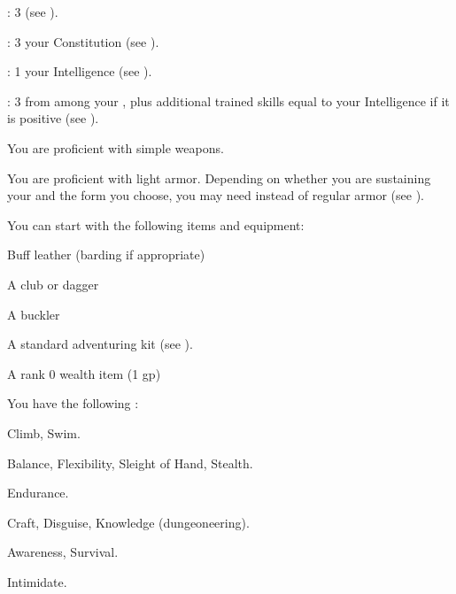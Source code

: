       \begin{raggeditemize}
          \item {}: 3 (see ).
          \item {}: 3 \add your Constitution (see ).
          \item {}: 1 \add your Intelligence (see ).
          \item {}: 3 from among your , plus additional trained skills equal to your Intelligence if it is positive (see ).
      \end{raggeditemize}

      You are proficient with simple weapons.

      You are proficient with light armor.
      Depending on whether you are sustaining your  and the form you choose, you may need  instead of regular armor (see ).

    You can start with the following items and equipment:
    \begin{raggeditemize}
        \item Buff leather (barding if appropriate)
        \item A club or dagger
        \item A buckler
        \item A standard adventuring kit (see ).
        \item A rank 0 wealth item (1 gp)
    \end{raggeditemize}

      You have the following :
      \begin{raggeditemize}
        \item {} Climb, Swim.
        \item {} Balance, Flexibility, Sleight of Hand, Stealth.
        \item {} Endurance.
        \item {} Craft, Disguise, Knowledge (dungeoneering).
        \item {} Awareness, Survival.
        \item {} Intimidate.
      \end{raggeditemize}

